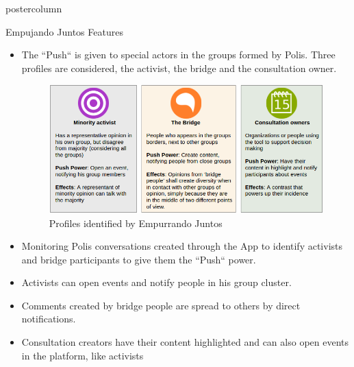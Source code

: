 \documentclass[final,hyperref={pdfpagelabels=false}]{beamer}
\begin{document}
\begin{frame}
\begin{columns}
\begin{column}{.49\textwidth}
\begin{beamercolorbox}[center,wd=\textwidth]{postercolumn}
\begin{minipage}[T]{.95\textwidth}
{\begin{block}{Empujando Juntos Features}
\begin{itemize}
    \item The ``Push`` is given to special actors in the groups formed by Polis.
    Three profiles are considered, the activist, the bridge and the consultation
    owner.

    \begin{figure}
      \begin{center}
        \includegraphics[scale=1.3]{../images/userprofiles.png}
        \caption{Profiles identified by Empurrando Juntos}
        \label{fig:background:free-software-repository}
      \end{center}
    \end{figure}

    \item Monitoring Polis conversations created through the App
    to identify activists and bridge participants to give them the ``Push``
    power.

    \item Activists can open events and notify people in his group cluster.

    \item Comments created by bridge people are spread to others by direct
    notifications.

    \item Consultation creators have their content highlighted and can also open
    events in the platform, like activists
  \end{itemize}
\end{block}

}
\end{minipage}
\end{beamercolorbox}
\end{column}


\end{columns}
\end{frame}
\end{document}
